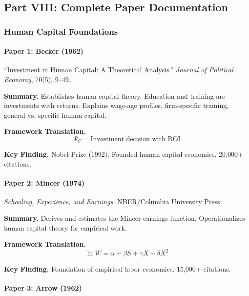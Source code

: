 \subsection{Part VIII: Complete Paper Documentation}

\subsubsection{Human Capital Foundations}

\paragraph{Paper 1: Becker (1962)}

``Investment in Human Capital: A Theoretical Analysis.''
\textit{Journal of Political Economy}, 70(5), 9--49.

\textbf{Summary.}
Establishes human capital theory. Education and training are investments 
with returns. Explains wage-age profiles, firm-specific training, general vs. 
specific human capital.

\textbf{Framework Translation.}
\begin{equation}
\Psi_C = \text{Investment decision with ROI}
\end{equation}

\textbf{Key Finding.}
Nobel Prize (1992). Founded human capital economics. 20,000+ citations.

\paragraph{Paper 2: Mincer (1974)}

\textit{Schooling, Experience, and Earnings.}
NBER/Columbia University Press.

\textbf{Summary.}
Derives and estimates the Mincer earnings function. Operationalizes human 
capital theory for empirical work.

\textbf{Framework Translation.}
\begin{equation}
\ln W = \alpha + \beta S + \gamma X + \delta X^2
\end{equation}

\textbf{Key Finding.}
Foundation of empirical labor economics. 15,000+ citations.

\paragraph{Paper 3: Arrow (1962)}

